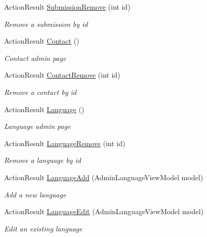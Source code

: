 \begin{DoxyCompactItemize}
Action\+Result \mbox{\hyperlink{class_ox_tots_1_1_controllers_1_1_admin_controller_a9d7879d9489418324413328fe639eb73}{Submission\+Remove}} (int id)
\begin{DoxyCompactList}\small\item\em Remove a submission by id \end{DoxyCompactList}\item 
Action\+Result \mbox{\hyperlink{class_ox_tots_1_1_controllers_1_1_admin_controller_a5a8967807e7285c22bc579b6ede0414c}{Contact}} ()
\begin{DoxyCompactList}\small\item\em Contact admin page \end{DoxyCompactList}\item 
Action\+Result \mbox{\hyperlink{class_ox_tots_1_1_controllers_1_1_admin_controller_ad74cf7ee9d9408aaaf2ea22f1e843b75}{Contact\+Remove}} (int id)
\begin{DoxyCompactList}\small\item\em Remove a contact by id \end{DoxyCompactList}\item 
Action\+Result \mbox{\hyperlink{class_ox_tots_1_1_controllers_1_1_admin_controller_aca6680a839cb3258b6c48608085b9346}{Language}} ()
\begin{DoxyCompactList}\small\item\em Language admin page \end{DoxyCompactList}\item 
Action\+Result \mbox{\hyperlink{class_ox_tots_1_1_controllers_1_1_admin_controller_a5b1c1aad12cca1e288ab2a90c85340d3}{Language\+Remove}} (int id)
\begin{DoxyCompactList}\small\item\em Remove a language by id \end{DoxyCompactList}\item 
Action\+Result \mbox{\hyperlink{class_ox_tots_1_1_controllers_1_1_admin_controller_a42ef443e84ddb7761c994fea092b8565}{Language\+Add}} (Admin\+Language\+View\+Model model)
\begin{DoxyCompactList}\small\item\em Add a new language \end{DoxyCompactList}\item 
Action\+Result \mbox{\hyperlink{class_ox_tots_1_1_controllers_1_1_admin_controller_af0ec3d77f9da1d2496ef9f9a194ebb4e}{Language\+Edit}} (Admin\+Language\+View\+Model model)
\begin{DoxyCompactList}\small\item\em Edit an existing language \end{DoxyCompactList}\item 

\end{DoxyCompactItemize}
